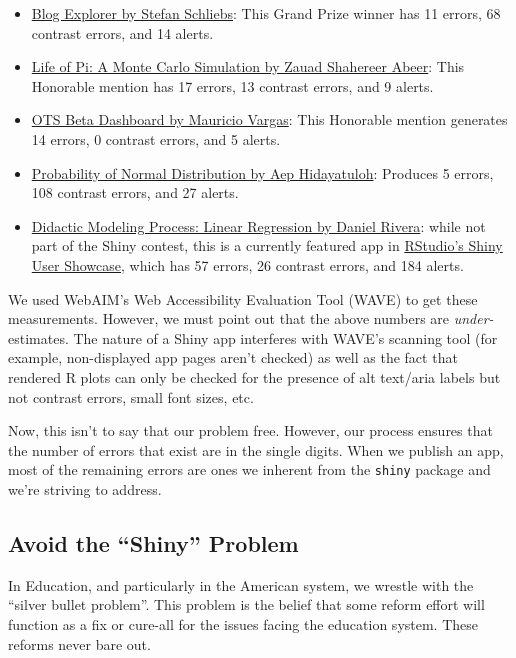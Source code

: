 \documentclass[
]{book}
\providecommand{\tightlist}{%
  \setlength{\itemsep}{0pt}\setlength{\parskip}{0pt}}
\begin{document}
\begin{itemize}
\tightlist
\item
  \href{https://nz-stefan.shinyapps.io/blog-explorer/\#data}{Blog Explorer by Stefan Schliebs}: This Grand Prize winner has 11 errors, 68 contrast errors, and 14 alerts.
\item
  \href{https://shahreyar-abeer.shinyapps.io/life_of_pi/}{Life of Pi: A Monte Carlo Simulation by Zauad Shahereer Abeer}: This Honorable mention has 17 errors, 13 contrast errors, and 9 alerts.
\item
  \href{https://pachamaltese.shinyapps.io/tradestatistics/}{OTS Beta Dashboard by Mauricio Vargas}: This Honorable mention generates 14 errors, 0 contrast errors, and 5 alerts.
\item
  \href{https://azures.shinyapps.io/normdist/}{Probability of Normal Distribution by Aep Hidayatuloh}: Produces 5 errors, 108 contrast errors, and 27 alerts.
\item
  \href{https://shiny.rstudio.com/gallery/didacting-modeling.html}{Didactic Modeling Process: Linear Regression by Daniel Rivera}: while not part of the Shiny contest, this is a currently featured app in \href{https://shiny.rstudio.com/gallery/}{RStudio's Shiny User Showcase}, which has 57 errors, 26 contrast errors, and 184 alerts.
\end{itemize}

We used WebAIM's Web Accessibility Evaluation Tool (WAVE) to get these measurements. However, we must point out that the above numbers are \emph{under-}estimates. The nature of a Shiny app interferes with WAVE's scanning tool (for example, non-displayed app pages aren't checked) as well as the fact that rendered R plots can only be checked for the presence of alt text/aria labels but not contrast errors, small font sizes, etc.

Now, this isn't to say that our problem free. However, our process ensures that the number of errors that exist are in the single digits. When we publish an app, most of the remaining errors are ones we inherent from the \texttt{shiny} package and we're striving to address.

\hypertarget{avoid-the-shiny-problem}{%
\subsection{Avoid the ``Shiny'' Problem}\label{avoid-the-shiny-problem}}

In Education, and particularly in the American system, we wrestle with the ``silver bullet problem''. This problem is the belief that some reform effort will function as a fix or cure-all for the issues facing the education system. These reforms never bare out.
\end{document}

